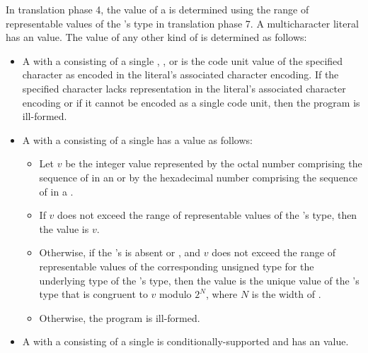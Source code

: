 \pnum
In translation phase 4,
the value of a  is determined
using the range of representable values
of the 's type in translation phase 7.
A multicharacter literal has an
value.
The value of any other kind of 
is determined as follows:
\begin{itemize}
\item
A  with
a  consisting of a single
,
, or
is the code unit value of the specified character
as encoded in the literal's associated character encoding.
If the specified character lacks
representation in the literal's associated character encoding or
if it cannot be encoded as a single code unit,
then the program is ill-formed.
\item
A  with
a  consisting of
a single 
has a value as follows:
\begin{itemize}
\item
Let $v$ be the integer value represented by
the octal number comprising
the sequence of  in
an  or by
the hexadecimal number comprising
the sequence of  in
a .
\item
If $v$ does not exceed
the range of representable values of the 's type,
then the value is $v$.
\item
Otherwise,
if the 's 
is absent or , and
$v$ does not exceed the range of representable values of the corresponding unsigned type for the underlying type of the 's type,
then the value is the unique value of the 's type  that is congruent to $v$ modulo $2^N$, where $N$ is the width of .
\item
Otherwise, the program is ill-formed.
\end{itemize}
\item
A  with
a  consisting of
a single 
is conditionally-supported and
has an  value.
\end{itemize}


